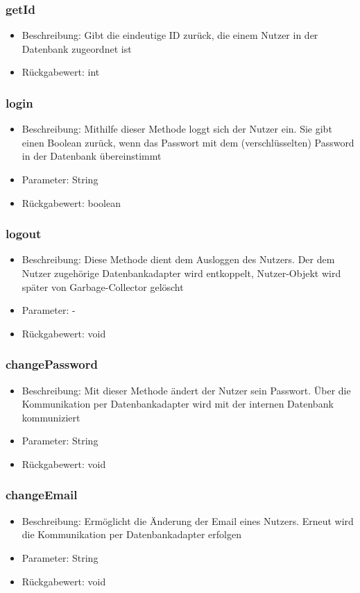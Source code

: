 \documentclass[a4paper]{scrreprt}
\begin{document}
	\subsubsection{getId}
	\begin{itemize}
		\item Beschreibung: Gibt die eindeutige ID zurück, die einem Nutzer in der Datenbank zugeordnet ist
		\item Rückgabewert: int
	\end{itemize}
	\subsubsection{login}
	\begin{itemize}
		\item Beschreibung: Mithilfe dieser Methode loggt sich der Nutzer ein. Sie gibt einen Boolean zurück, wenn das Passwort mit dem (verschlüsselten) Password in der Datenbank übereinstimmt
		\item Parameter: String
		\item Rückgabewert: boolean
	\end{itemize}
	\subsubsection{logout}
	\begin{itemize}
		\item Beschreibung: Diese Methode dient dem Ausloggen des Nutzers. Der dem Nutzer zugehörige Datenbankadapter wird entkoppelt, Nutzer-Objekt wird später von Garbage-Collector gelöscht
		\item Parameter: -
		\item Rückgabewert: void
	\end{itemize}
	\subsubsection{changePassword}
	\begin{itemize}
		\item Beschreibung: Mit dieser Methode ändert der Nutzer sein Passwort. Über die Kommunikation per Datenbankadapter wird mit der internen Datenbank kommuniziert
		\item Parameter: String
		\item Rückgabewert: void
	\end{itemize}
	\subsubsection{changeEmail}
	\begin{itemize}
		\item Beschreibung: Ermöglicht die Änderung der Email eines Nutzers. Erneut wird die Kommunikation per Datenbankadapter erfolgen
		\item Parameter: String
		\item Rückgabewert: void
	\end{itemize}
\end{document}
